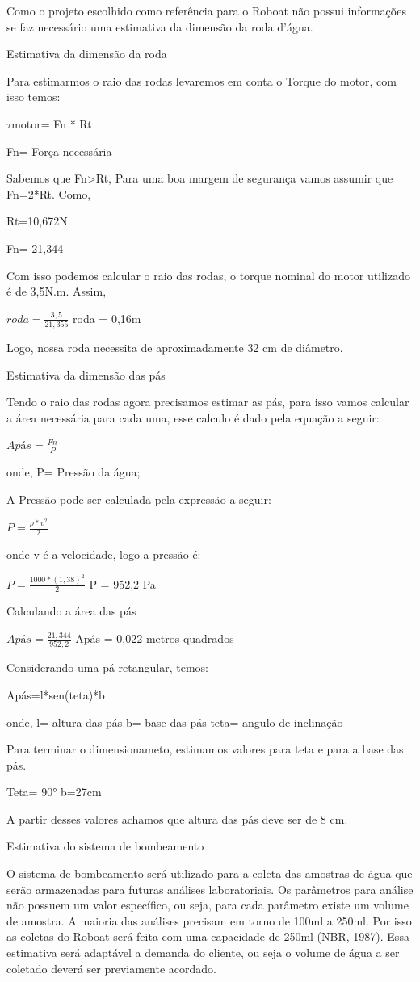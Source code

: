 Como o projeto escolhido como referência para o Roboat não possui informações se faz necessário uma estimativa da dimensão da roda d’água.

Estimativa da dimensão da roda  

Para estimarmos o raio das rodas levaremos em conta o Torque do motor, com isso temos:

$\tau$motor= Fn * Rt

Fn= Força necessária

Sabemos que Fn>Rt, Para uma boa margem de segurança vamos assumir que Fn=2*Rt.
Como, 

Rt=10,672N 

Fn= 21,344

Com isso podemos calcular o raio das rodas, o torque nominal do motor utilizado é de 3,5N.m.
Assim,

$roda=\frac{3,5}{21,355}$
roda = 0,16m

Logo, nossa roda necessita de aproximadamente 32 cm de diâmetro.

Estimativa da dimensão das pás

Tendo o raio das rodas agora precisamos estimar as pás, para isso vamos calcular a área necessária para cada uma, esse calculo é dado pela equação a seguir:

$Apás=\frac{Fn}{P}$

onde, 
P= Pressão da água;

A Pressão pode ser calculada pela expressão a seguir:

$P=\frac{\rho*v^2}{2}$

onde v é a velocidade, logo a pressão é:

$P=\frac{1000*(1,38)^2}{2}$
P = 952,2 Pa

Calculando a área das pás

$Apás=\frac{21,344}{952,2}$
Apás = 0,022 metros quadrados 

Considerando uma pá retangular, temos:

Apás=l*sen(teta)*b

onde, 
l= altura das pás
b= base das pás 
teta= angulo de inclinação 

Para terminar o dimensionameto, estimamos valores para teta e para a base das pás. 

Teta= 90°
b=27cm

A partir desses valores achamos que altura das pás deve ser de 8 cm.

Estimativa do sistema de bombeamento
    
O sistema de bombeamento será utilizado para a coleta das amostras de água que serão armazenadas para futuras análises laboratoriais. Os parâmetros para análise não possuem um valor específico, ou seja, para cada parâmetro existe um volume de amostra. A maioria das análises precisam em torno de 100ml a 250ml. Por isso as coletas do Roboat será feita com uma capacidade de 250ml (NBR, 1987). Essa estimativa será adaptável a demanda do cliente, ou seja o volume de água a ser coletado deverá ser previamente acordado.


